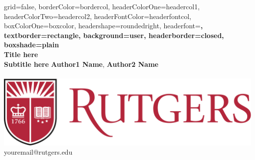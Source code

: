 \documentclass[a0paper,landscape,columns=3]{../includes/tex/baposter}
\begin{document}
\begin{poster}{
  grid=false,
  borderColor=bordercol,         %
  headerColorOne=headercol1,     %
  headerColorTwo=headercol2,     %
  headerFontColor=headerfontcol, %
  boxColorOne=boxcolor,          %
  headershape=roundedright,      %
  headerfont=\Large\sf\bf,       %
  textborder=rectangle,
  background=user,
  headerborder=closed,           %
  boxshade=plain
}
{}
%
%
{
 \sf\bf 
 \phantom{.} \\ 
 \vspace{0.2in}
 \LARGE{Title here} \\ 
 \Large{Subtitle here}
}
{
 \vspace{.6em} 
 \textbf{Author1 Name}, 
 \textbf{Author2 Name} \\ 
  \\
 {\vspace{-0.4in}\hspace{-10.40in}
  \includegraphics[scale=0.3]{../includes/figs/ru_shield2}\phantom{.}} \\
 {\vspace{-0.20in}\smaller youremail@rutgers.edu} \\
 {\vspace{-0.9in}\hspace{11.05in}
}}
\end{poster}
\end{document}
